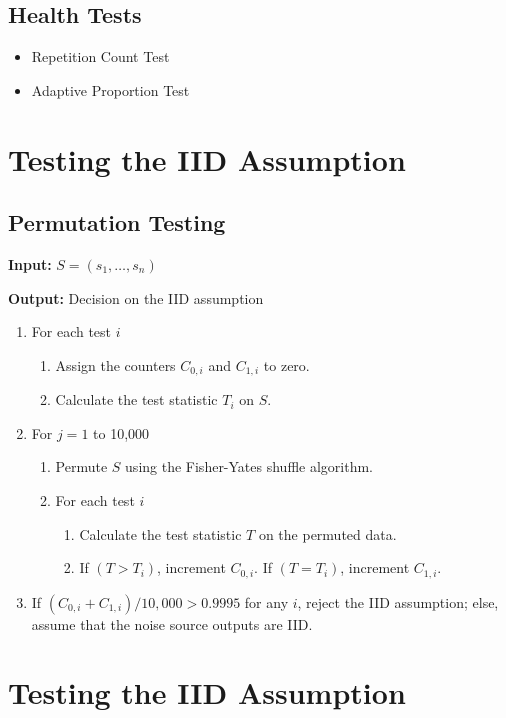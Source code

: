 \documentclass[12pt,openany]{book}
\theoremstyle{definition}
\begin{document}
\subsection*{Health Tests}
\begin{itemize}
	\item Repetition Count Test
	\item Adaptive Proportion Test
\end{itemize}

\section*{Testing the IID Assumption}
\subsection*{Permutation Testing}

\textbf{Input:} \( S = (s_1, \ldots, s_n) \)

\textbf{Output:} Decision on the IID assumption

\begin{enumerate}[1]
	\item For each test \( i \)
	\begin{enumerate}[a]
		\item Assign the counters \( C_{0,i} \) and \( C_{1,i} \) to zero.
		\item Calculate the test statistic \( T_i \) on \( S \).
	\end{enumerate}
	\item For \( j = 1 \) to 10,000
	\begin{enumerate}[1]
		\item Permute \( S \) using the Fisher-Yates shuffle algorithm.
		\item For each test \( i \)
		\begin{enumerate}[a]
			\item Calculate the test statistic \( T \) on the permuted data.
			\item If \( (T > T_i) \), increment \( C_{0,i} \). If \( (T = T_i) \), increment \( C_{1,i} \).
		\end{enumerate}
	\end{enumerate}
	\item If \( (C_{0,i} + C_{1,i})/10,000 > 0.9995 \) for any \( i \), reject the IID assumption; else, assume that the noise source outputs are IID.
\end{enumerate}

\section*{Testing the IID Assumption}
\end{document}
